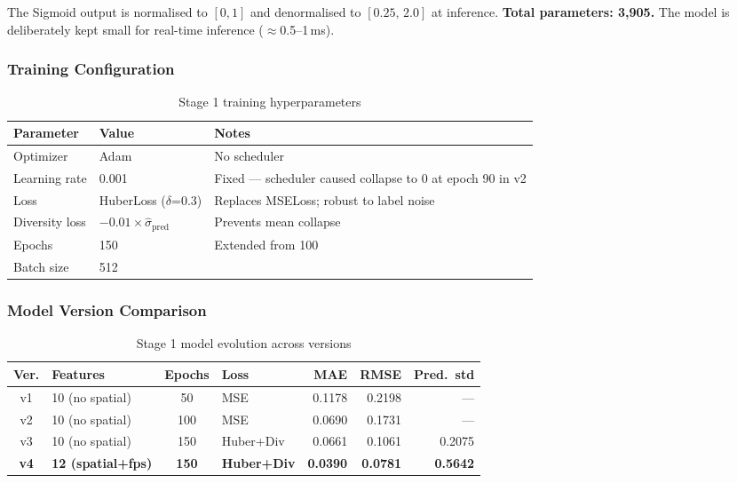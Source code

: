 \documentclass[12pt, a4paper]{article}
\begin{document}
The Sigmoid output is normalised to $[0,1]$ and denormalised to
$[0.25,\,2.0]$ at inference.
\textbf{Total parameters: 3,905.}
The model is deliberately kept small for real-time inference ($\approx$0.5–1\,ms).

\subsubsection{Training Configuration}

\begin{table}[H]
\centering
\caption{Stage 1 training hyperparameters}
\label{tab:s1train}
\begin{tabular}{l l p{6cm}}
\toprule
Parameter & Value & Notes\\
\midrule
Optimizer & Adam & No scheduler\\
Learning rate & 0.001 & Fixed — scheduler caused collapse to 0 at epoch 90 in v2\\
Loss & HuberLoss ($\delta$=0.3) & Replaces MSELoss; robust to label noise\\
Diversity loss & $-0.01 \times \hat{\sigma}_{\text{pred}}$ & Prevents mean collapse\\
Epochs & 150 & Extended from 100\\
Batch size & 512 & \\
\bottomrule
\end{tabular}
\end{table}

\subsubsection{Model Version Comparison}

\begin{table}[H]
\centering
\caption{Stage 1 model evolution across versions}
\label{tab:s1versions}
\begin{tabularx}{\textwidth}{c l c l r r r}
\toprule
Ver. & Features & Epochs & Loss & MAE & RMSE & Pred.\ std\\
\midrule
v1 & 10 (no spatial) & 50 & MSE & 0.1178 & 0.2198 & —\\
v2 & 10 (no spatial) & 100 & MSE & 0.0690 & 0.1731 & —\\
v3 & 10 (no spatial) & 150 & Huber+Div & 0.0661 & 0.1061 & 0.2075\\
\textbf{v4} & \textbf{12 (spatial+fps)} & \textbf{150} & \textbf{Huber+Div} & \textbf{0.0390} & \textbf{0.0781} & \textbf{0.5642}\\
\bottomrule
\end{tabularx}
\end{table}
\end{document}
